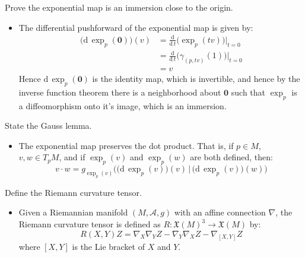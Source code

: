 \documentclass{beamer}
\begin{document}
    \begin{frame}
        Prove the exponential map is an immersion close to the origin.
        \begin{itemize}
            \item The differential pushforward of the exponential map is given
                by:
                \begin{align}
                    \big(\textrm{d}\,\exp_{p}(\mathbf{0})\big)(v)
                        &=\frac{\textrm{d}}{\textrm{d}\,t}
                            \Big(\exp_{p}(tv)\Big)\Big|_{t=0}\\
                        &=\frac{\textrm{d}}{\textrm{d}\,t}
                            \Big(\gamma_{(p,tv)}(1)\Big)\Big|_{t=0}\\
                        &=v
                \end{align}
                Hence $\textrm{d}\,\exp_{p}(\mathbf{0})$ is the identity map,
                which is invertible, and hence by the inverse function theorem
                there is a neighborhood about $\mathbf{0}$ such that
                $\exp_{p}$ is a diffeomorphism onto it's image, which is an
                immersion.
        \end{itemize}
    \end{frame}
    \begin{frame}
        State the Gauss lemma.
        \begin{itemize}
            \item The exponential map preserves the dot product. That is, if
                $p\in{M}$, $v,w\in{T}_{p}M$, and if
                $\exp_{p}(v)$ and $\exp_{p}(w)$ are both defined, then:
                \begin{equation}
                    v\cdot{w}=
                        g_{\exp_{p}(v)}\Big(
                            \big(\textrm{d}\,\exp_{p}(v)\big)(v)\,|\,
                            \big(\textrm{d}\,\exp_{p}(v)\big)(w)\Big)
                \end{equation}
        \end{itemize}
    \end{frame}
    \begin{frame}
        Define the Riemann curvature tensor.
        \begin{itemize}
            \item Given a Riemannian manifold $(M,\mathcal{A},g)$ with an
                affine connection $\nabla$, the Riemann curvature tensor is
                defined as $R:\mathfrak{X}(M)^{3}\rightarrow\mathfrak{X}(M)$ by:
                \begin{equation}
                    R(X,Y)Z=\nabla_{X}\nabla_{Y}Z-
                        \nabla_{Y}\nabla_{X}Z-\nabla_{[X,Y]}Z
                \end{equation}
                where $[X,Y]$ is the Lie bracket of $X$ and $Y$.
        \end{itemize}
    \end{frame}
\end{document}
